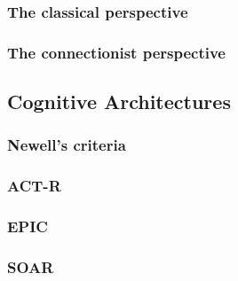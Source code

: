 



\subsubsection{The classical perspective}

\subsubsection{The connectionist perspective}

\subsection{Cognitive Architectures}

\subsubsection{Newell's criteria}

\subsubsection{ACT-R}

\subsubsection{EPIC}

\subsubsection{SOAR} 
\label{ClassicalPerspective}
   